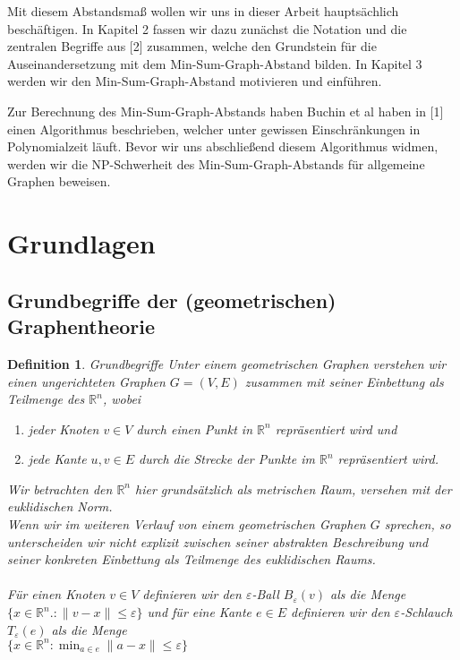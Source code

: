 \documentclass[a4paper, 12pt, twoside]{article}
\theoremstyle{Format1} %
\newtheorem{Def}{Definition}[section]       %
\begin{document}
Mit diesem Abstandsmaß wollen wir uns in dieser Arbeit hauptsächlich beschäftigen.
In Kapitel 2 fassen wir dazu zunächst die Notation und die zentralen Begriffe aus [2] zusammen, welche den Grundstein für die Auseinandersetzung mit dem Min-Sum-Graph-Abstand bilden.
In Kapitel 3 werden wir den Min-Sum-Graph-Abstand motivieren und einführen.

Zur Berechnung des Min-Sum-Graph-Abstands haben Buchin et al haben in [1] einen Algorithmus beschrieben, welcher unter gewissen Einschränkungen in Polynomialzeit läuft.
Bevor wir uns abschließend diesem Algorithmus widmen, werden wir die NP-Schwerheit des Min-Sum-Graph-Abstands für allgemeine Graphen beweisen.
\newpage

\section{Grundlagen}

\subsection{Grundbegriffe der (geometrischen) Graphentheorie}
\begin{Def}
	Grundbegriffe
	Unter einem \textit{geometrischen Graphen} verstehen wir einen ungerichteten Graphen $G=(V, E)$ zusammen mit seiner Einbettung als Teilmenge des $ \mathbb{R}^n $, wobei
    	\begin{enumerate}
		\item[1)] jeder Knoten $v \in V $ durch einen Punkt in $ \mathbb{R}^n $ repräsentiert wird und
		\item[2)] jede Kante ${u,v} \in E$ durch die Strecke der Punkte im $ \mathbb{R}^n $ repräsentiert wird.
    	\end{enumerate}

	Wir betrachten den $ \mathbb{R}^n $ hier grundsätzlich als metrischen Raum, versehen mit der euklidischen Norm.
	\\
	Wenn wir im weiteren Verlauf von einem geometrischen Graphen $G$ sprechen, so unterscheiden wir nicht explizit zwischen seiner abstrakten
	Beschreibung und seiner konkreten Einbettung als Teilmenge des euklidischen Raums.
	\\
	\\
	Für einen Knoten $v \in V$ definieren wir den \textit{$\varepsilon$-Ball} $B_{\varepsilon}(v)$ als die Menge
	$\{x \in \mathbb{R}^n.: \|v-x\| \leq \varepsilon\}$
	und für eine Kante $e \in E$ definieren wir den \textit{$\varepsilon$-Schlauch} $T_{\varepsilon}(e)$ als die Menge
	\\
	$\{x \in \mathbb{R}^n: \min_{a \in e}\|a-x\| \leq \varepsilon\}$
\end{Def}
\end{document}
